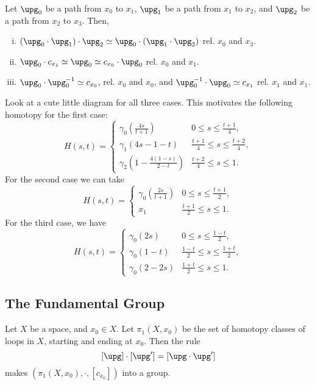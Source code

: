\documentclass[12pt]{article}
\begin{document}

\begin{proposition}
	Let $\upg_0$ be a path from $x_0$ to $x_1$, $\upg_1$ be a path from $x_1$ to $x_2$, and $\upg_2$ be a path from $x_2$ to $x_3$. Then,
	\begin{enumerate}[(i)]
		\item $(\upg_0 \cdot \upg_1) \cdot \upg_2 \simeq \upg_0 \cdot (\upg_1 \cdot \upg_2)$ rel. $x_0$ and $x_3$.
		\item $\upg_0 \cdot c_{x_1} \simeq \upg_0 \simeq c_{x_0} \cdot \upg_0$ rel. $x_0$ and $x_1$.
		\item $\upg_0 \cdot \upg_0^{-1} \simeq c_{x_0}$, rel. $x_0$ and $x_0$, and $\upg_0^{-1} \cdot \upg_0 \simeq c_{x_1}$ rel. $x_1$ and $x_1$.
	\end{enumerate}
\end{proposition}

\begin{proofbox}
	Look at a cute little diagram for all three cases. This motivates the following homotopy for the first case:
	\[
	H(s, t) =
	\begin{cases}
		\gamma_0(\frac{4s}{t+1}) & 0 \leq s \leq \frac{t + 1}{4},\\
		\gamma_1(4s-1-t) & \frac{t+1}{4} \leq s \leq \frac{t+2}{4},\\
		\gamma_2(1 - \frac{4(1-s)}{2 - t}) & \frac{t+2}{4} \leq s \leq 1.
	\end{cases}
	\]
	For the second case we can take
	\[
	H(s, t)=
	\begin{cases}
		\gamma_0(\frac{2s}{t + 1}) & 0 \leq s \leq \frac{t+1}{2}, \\
		x_1 & \frac{t+1}{2} \leq s \leq 1.
	\end{cases}
	\]
	For the third case, we have
	\[
	H(s, t) =
	\begin{cases}
		\gamma_0(2s) & 0 \leq s \leq \frac{1 - t}{2}, \\
		\gamma_0(1-t) & \frac{1 - t}{2} \leq s \leq \frac{1 + t}{2}, \\
		\gamma_0(2 - 2s) & \frac{1 + t}{2} \leq s \leq 1.
	\end{cases}
	\]
\end{proofbox}

\subsection{The Fundamental Group}
\label{sub:fun_g}

\begin{theorem}
	Let $X$ be a space, and $x_0 \in X$. Let $\pi_1(X, x_0)$ be the set of homotopy classes of loops in $X$, starting and ending at $x_0$. Then the rule
	\[
		[\upg] \cdot [\upg'] = [\upg \cdot \upg']
	\]
	makes $(\pi_1(X, x_0), \cdot, [c_{x_0}])$ into a group.
\end{theorem}
\end{document}
